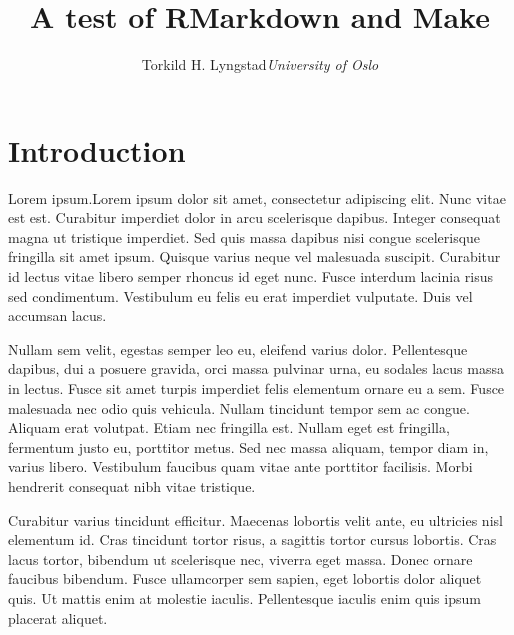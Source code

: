\documentclass[12pt,article,oneside]{memoir}
\title{\bigskip \bigskip A test of RMarkdown and Make
}
\author{\normalsize Torkild H. Lyngstad\vspace{0.03in}\newline\footnotesize\emph{University of Oslo}\vspace*{0.2in}\newline }
\date{}
\begin{document}
  
\setsansfont[Mapping=tex-text, Ligatures=Common]{Concourse T4} 
\setmonofont[Mapping=tex-text,Scale=0.75]{PragmataPro Mono}



\pagestyle{kjh}
\thispagestyle{empty}


\maketitle






\newpage\noindent
\section{Introduction}\label{introduction}

Lorem ipsum.Lorem ipsum dolor sit amet, consectetur adipiscing elit.
Nunc vitae est est. Curabitur imperdiet dolor in arcu scelerisque
dapibus. Integer consequat magna ut tristique imperdiet. Sed quis massa
dapibus nisi congue scelerisque fringilla sit amet ipsum. Quisque varius
neque vel malesuada suscipit. Curabitur id lectus vitae libero semper
rhoncus id eget nunc. Fusce interdum lacinia risus sed condimentum.
Vestibulum eu felis eu erat imperdiet vulputate. Duis vel accumsan
lacus.

Nullam sem velit, egestas semper leo eu, eleifend varius dolor.
Pellentesque dapibus, dui a posuere gravida, orci massa pulvinar urna,
eu sodales lacus massa in lectus. Fusce sit amet turpis imperdiet felis
elementum ornare eu a sem. Fusce malesuada nec odio quis vehicula.
Nullam tincidunt tempor sem ac congue. Aliquam erat volutpat. Etiam nec
fringilla est. Nullam eget est fringilla, fermentum justo eu, porttitor
metus. Sed nec massa aliquam, tempor diam in, varius libero. Vestibulum
faucibus quam vitae ante porttitor facilisis. Morbi hendrerit consequat
nibh vitae tristique.

Curabitur varius tincidunt efficitur. Maecenas lobortis velit ante, eu
ultricies nisl elementum id. Cras tincidunt tortor risus, a sagittis
tortor cursus lobortis. Cras lacus tortor, bibendum ut scelerisque nec,
viverra eget massa. Donec ornare faucibus bibendum. Fusce ullamcorper
sem sapien, eget lobortis dolor aliquet quis. Ut mattis enim at molestie
iaculis. Pellentesque iaculis enim quis ipsum placerat aliquet.
\end{document}

